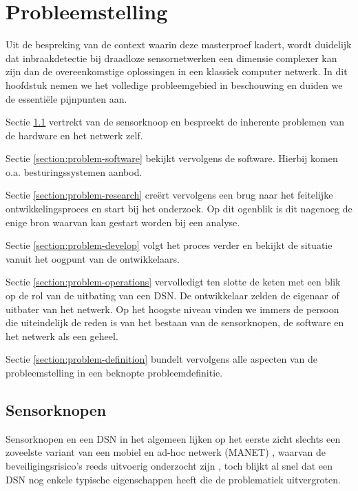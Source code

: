 
\chapter{Probleemstelling}
\label{chapter:probleemstelling}

Uit de bespreking van de context waarin deze masterproef kadert, wordt
duidelijk dat inbraakdetectie bij draadloze sensornetwerken een dimensie
complexer kan zijn dan de overeenkomstige oplossingen in een klassiek computer
netwerk. In dit hoofdstuk nemen we het volledige probleemgebied in beschouwing
en duiden we de essenti\"ele pijnpunten aan.

Sectie \ref{section:problem-hardware} vertrekt van de sensorknoop en bespreekt
de inherente problemen van de hardware en het netwerk zelf.

Sectie \ref{section:problem-software} bekijkt vervolgens de software. Hierbij
komen o.a. besturingssystemen aanbod.

Sectie \ref{section:problem-research} cre\"ert vervolgens een brug naar het
feitelijke ontwikkelingsproces en start bij het onderzoek. Op dit ogenblik is
dit nagenoeg de enige bron waarvan kan gestart worden bij een analyse.

Sectie \ref{section:problem-develop} volgt het proces verder en bekijkt de
situatie vanuit het oogpunt van de ontwikkelaars.

Sectie \ref{section:problem-operations} vervolledigt ten slotte de keten met
een blik op de rol van de uitbating van een DSN. De ontwikkelaar zelden de
eigenaar of uitbater van het netwerk. Op het hoogste niveau vinden we immers de
persoon die uiteindelijk de reden is van het bestaan van de sensorknopen, de
software en het netwerk als een geheel.

Sectie \ref{section:problem-definition} bundelt vervolgens alle aspecten van de
probleemstelling in een beknopte probleemdefinitie.

\section{Sensorknopen}
\label{section:problem-hardware}

Sensorknopen en een DSN in het algemeen lijken op het eerste zicht slechts een
zoveelste variant van een mobiel en ad-hoc netwerk (MANET)
\citep{garg2010mobile}, waarvan de beveiligingsrisico's reeds uitvoerig
onderzocht zijn \citep{djenouri2005survey, zhang2000intrusion,
kachirski2003effective}, toch blijkt al snel dat een DSN nog enkele typische
eigenschappen heeft die de problematiek uitvergroten.

